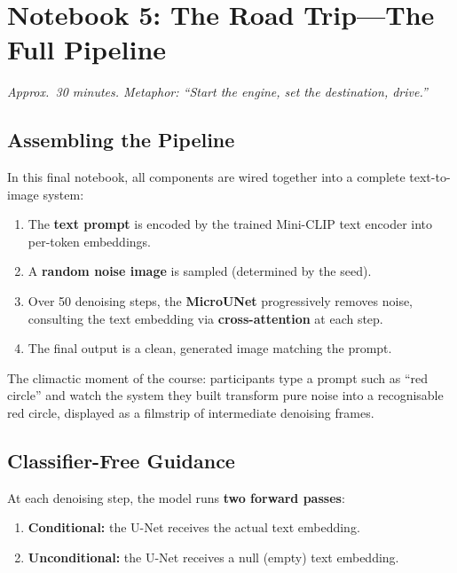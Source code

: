 \documentclass[11pt,a4paper]{article}
\begin{document}
\section{Notebook 5: The Road Trip---The Full Pipeline}
\label{sec:nb5}

\textit{Approx.\ 30 minutes.  Metaphor: ``Start the engine, set the
destination, drive.''}

\subsection{Assembling the Pipeline}

In this final notebook, all components are wired together into a complete
text-to-image system:

\begin{enumerate}[nosep]
  \item The \textbf{text prompt} is encoded by the trained Mini-CLIP
        text encoder into per-token embeddings.
  \item A \textbf{random noise image} is sampled (determined by the
        seed).
  \item Over 50 denoising steps, the \textbf{MicroUNet} progressively
        removes noise, consulting the text embedding via
        \textbf{cross-attention} at each step.
  \item The final output is a clean, generated image matching the prompt.
\end{enumerate}

The climactic moment of the course: participants type a prompt such as
``red circle'' and watch the system they built transform pure noise into
a recognisable red circle, displayed as a filmstrip of intermediate
denoising frames.

\subsection{Classifier-Free Guidance}

At each denoising step, the model runs \textbf{two forward passes}:

\begin{enumerate}[nosep]
  \item \textbf{Conditional:} the U-Net receives the actual text
        embedding.
  \item \textbf{Unconditional:} the U-Net receives a null (empty) text
        embedding.
\end{enumerate}
\end{document}
